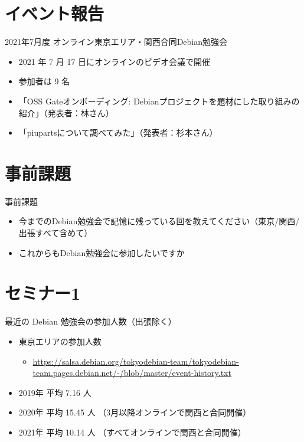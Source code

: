 \section{イベント報告}

\begin{frame}{2021年7月度 オンライン東京エリア・関西合同Debian勉強会}
\begin{itemize}
\item 2021 年 7 月 17 日にオンラインのビデオ会議で開催
\item 参加者は 9 名
\item 「OSS Gateオンボーディング: Debianプロジェクトを題材にした取り組みの紹介」（発表者：林さん）
\item 「piupartsについて調べてみた」（発表者：杉本さん）
\end{itemize}
\end{frame}

\section{事前課題}

\begin{frame}{事前課題}
  \begin{itemize}
  \item 今までのDebian勉強会で記憶に残っている回を教えてください（東京/関西/出張すべて含めて）
  \item これからもDebian勉強会に参加したいですか
  \end{itemize}
\end{frame}

{\footnotesize
  
}

%

\section{セミナー1}

\begin{frame}{最近の Debian 勉強会の参加人数（出張除く）}
  \begin{itemize}
  \item 東京エリアの参加人数
    \begin{itemize}
    \item \url{https://salsa.debian.org/tokyodebian-team/tokyodebian-team.pages.debian.net/-/blob/master/event-history.txt}
    \end{itemize}
  \item 2019年 平均  7.16 人
  \item 2020年 平均 15.45 人 （3月以降オンラインで関西と合同開催）
  \item 2021年 平均 10.14 人 （すべてオンラインで関西と合同開催）
  \end{itemize}
\end{frame}


